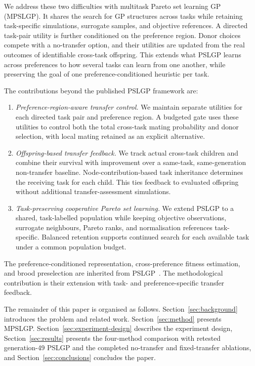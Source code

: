 \documentclass[10pt,journal]{IEEEtran}
\newcommand{\resultrevision}[1]{\textcolor{resultrevision}{#1}}
\begin{document}
We address these two difficulties with multitask Pareto set learning GP (MPSLGP). It shares the search for GP structures across tasks while retaining task-specific simulations, surrogate samples, and objective references. A directed task-pair utility is further conditioned on the preference region. Donor choices compete with a no-transfer option, and their utilities are updated from the real outcomes of identifiable cross-task offspring. This extends what PSLGP learns across preferences to how several tasks can learn from one another, while preserving the goal of one preference-conditioned heuristic per task.

The contributions beyond the published PSLGP framework are:
\begin{enumerate}[leftmargin=*,nosep]
    \item \emph{Preference-region-aware transfer control.} We maintain separate utilities for each directed task pair and preference region. A budgeted gate uses these utilities to control both the total cross-task mating probability and donor selection, with local mating retained as an explicit alternative.
    \item \emph{Offspring-based transfer feedback.} We track actual cross-task children and combine their survival with improvement over a same-task, same-generation non-transfer baseline. Node-contribution-based task inheritance determines the receiving task for each child. This ties feedback to evaluated offspring without additional transfer-assessment simulations.
    \item \emph{Task-preserving cooperative Pareto set learning.} We extend PSLGP to a shared, task-labelled population while keeping objective observations, surrogate neighbours, Pareto ranks, and normalisation references task-specific. Balanced retention supports continued search for each available task under a common population budget.
\end{enumerate}
The preference-conditioned representation, cross-preference fitness estimation, and brood preselection are inherited from PSLGP~\cite{xu2026pslgp}. The methodological contribution is their extension with task- and preference-specific transfer feedback.

The remainder of this paper is organised as follows. Section~\ref{sec:background} introduces the problem and related work. Section~\ref{sec:method} presents MPSLGP. Section~\ref{sec:experiment-design} describes the experiment design, Section~\ref{sec:results} presents \resultrevision{the four-method comparison with retested generation-49 PSLGP and the completed no-transfer and fixed-transfer ablations}, and Section~\ref{sec:conclusions} concludes the paper.
\end{document}
